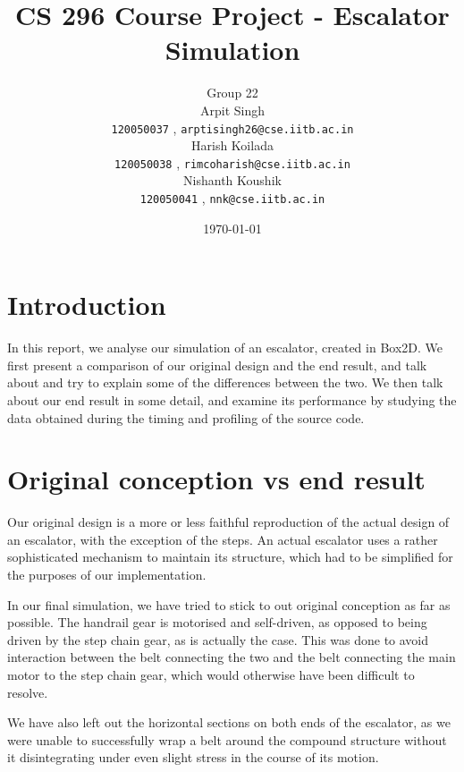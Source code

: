 \documentclass[11pt]{article}
\begin{document}
\title{CS 296 Course Project - Escalator Simulation}

\author{
	Group 22\\
	Arpit Singh\\ 
	\texttt{120050037} , \texttt{arptisingh26@cse.iitb.ac.in} \\
	Harish Koilada\\ 
	\texttt{120050038} , \texttt{rimcoharish@cse.iitb.ac.in} \\
	Nishanth Koushik\\ 
	\texttt{120050041} , \texttt{nnk@cse.iitb.ac.in}
}

\date{\today}

\maketitle

\section{Introduction}

	In this report, we analyse our simulation of an escalator, created in Box2D. We first present a comparison of our original design and the end result, and talk about and try to explain some of the differences between the two. We then talk about our end result in some detail, and examine its performance by studying the data obtained during the timing and profiling of the source code.

\section{Original conception vs end result}

	Our original design is a more or less faithful reproduction of the actual design of an escalator, with the exception of the steps. An actual escalator uses a rather sophisticated mechanism to maintain its structure, which had to be simplified for the purposes of our implementation.
	
	In our final simulation, we have tried to stick to out original conception as far as possible. The handrail gear is motorised and self-driven, as opposed to being driven by the step chain gear, as is actually the case. This was done to avoid interaction between the belt connecting the two and the belt connecting the main motor to the step chain gear, which would otherwise have been difficult to resolve.
	
	We have also left out the horizontal sections on both ends of the escalator, as we were unable to successfully wrap a belt around the compound structure without it disintegrating under even slight stress in the course of its motion.
\end{document}
